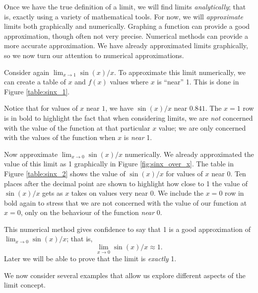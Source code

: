 Once we have the true definition of a limit, we will find limits \textit{analytically}; that is, exactly using a variety of mathematical tools. For now, we will \textit{approximate} limits both graphically and numerically. Graphing a function can provide a good approximation, though often not very precise. Numerical methods can provide a more accurate approximation. We have already approximated limits graphically, so we now turn our attention to numerical approximations.


Consider again $\lim_{x\to 1}\sin (x)/x$. To approximate this limit numerically, we can create a table of $x$ and $f(x)$ values where $x$ is ``near'' 1. This is done in Figure \ref{table:sinx_1}.\par

Notice that for values of $x$ near $1$, we have $\sin (x)/x$ near $0.841$. The $x=1$ row is in bold to highlight the fact that when considering limits, we are \textit{not} concerned with the value of the function at that particular $x$ value; we are only concerned with the values of the function when $x$ is \textit{near} 1. 



Now approximate $\lim_{x\to 0} \sin(x)/x$ numerically. We already approximated the value of this limit as 1 graphically in Figure \ref{fig:sinx_over_x}. The table in Figure \ref{table:sinx_2} shows the value of $\sin(x)/x$ for values of $x$ near 0. Ten places after the decimal point are shown to highlight how close to 1 the value of $\sin(x)/x$ gets as $x$ takes on values very near 0. We include the $x=0$ row in bold again to stress that we are not concerned with the value of our function at $x=0$, only on the behaviour of the function \textit{near} 0. 

 
This numerical method gives confidence to say that 1 is a good approximation of $\lim_{x\to 0} \sin(x)/x$; that is, 
\[
\lim_{x\to 0} \sin(x)/x \approx 1.
\]
Later we will be able to prove that the limit is \textit{exactly} 1.

We now consider several examples that allow us explore different aspects of the limit concept.\\



